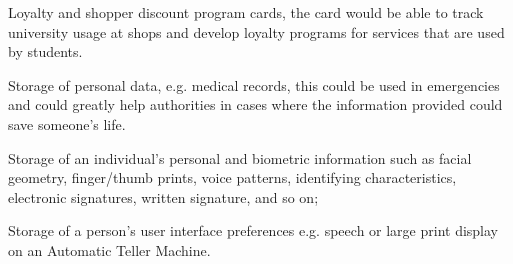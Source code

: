 \subitems Loyalty and shopper discount program cards, the card would be able to
track university usage at shops and develop loyalty programs for services that
are used by students. 

\subitems Storage of personal data, e.g. medical records, this could be used in
emergencies and could greatly help authorities in cases where the information
provided could save someone's life. 

\subitems Storage of an individual's personal and biometric information such as
facial geometry, finger/thumb prints, voice patterns, identifying
characteristics, electronic signatures, written signature, and so on;

\subitems Storage of a person's user interface preferences e.g. speech or
large print display on an Automatic Teller Machine.
